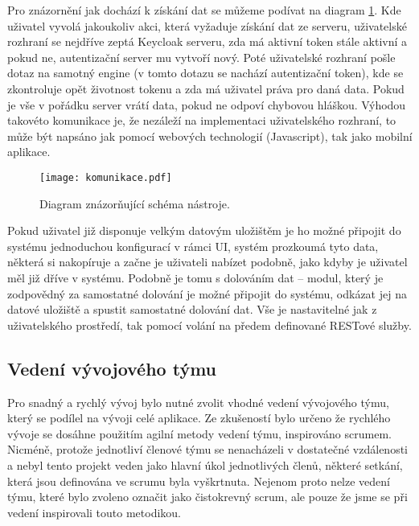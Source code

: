 \par Pro znázornění jak dochází k získání dat se můžeme podívat na diagram \ref{komunikace}. Kde uživatel vyvolá jakoukoliv akci, která vyžaduje získání dat ze serveru, uživatelské rozhraní se nejdříve zeptá Keycloak serveru, zda má aktivní token stále aktivní a pokud ne, autentizační server mu vytvoří nový. Poté uživatelské rozhraní pošle dotaz na samotný engine (v tomto dotazu se nachází autentizační token), kde se zkontroluje opět životnost tokenu a zda má uživatel práva pro daná data. Pokud je vše v pořádku server vrátí data, pokud ne odpoví chybovou hláškou. Výhodou takovéto komunikace je, že nezáleží na implementaci uživatelského rozhraní, to může být napsáno jak pomocí webových technologií (Javascript), tak jako mobilní aplikace.

\begin{figure}[htp]
\centering
\texttt{[image: komunikace.pdf]}
\caption{Diagram znázorňující schéma nástroje.}
\label{komunikace}
\end{figure}

\par Pokud uživatel již disponuje velkým datovým uložištěm je ho možné připojit do systému jednoduchou konfigurací v rámci UI, systém prozkoumá tyto data, některá si nakopíruje a začne je uživateli nabízet podobně, jako kdyby je uživatel měl již dříve v systému. Podobně je tomu s dolováním dat -- modul, který je zodpovědný za samostatné dolování je možné připojit do systému, odkázat jej na datové uložiště a spustit samostatné dolování dat. Vše je nastavitelné jak z uživatelského prostředí, tak pomocí volání na předem definované RESTové služby.

\subsection{Vedení vývojového týmu}
\par Pro snadný a rychlý vývoj bylo nutné zvolit vhodné vedení vývojového týmu, který se podílel na vývoji celé aplikace. Ze zkušeností bylo určeno že rychlého vývoje se dosáhne použitím agilní metody vedení týmu, inspirováno scrumem. Nicméně, protože jednotliví členové týmu se nenacházeli v dostatečné vzdálenosti a nebyl tento projekt veden jako hlavní úkol jednotlivých členů, některé setkání, která jsou definována ve scrumu byla vyškrtnuta. Nejenom proto nelze vedení týmu, které bylo zvoleno označit jako čistokrevný scrum, ale pouze že jsme se při vedení inspirovali touto metodikou.

